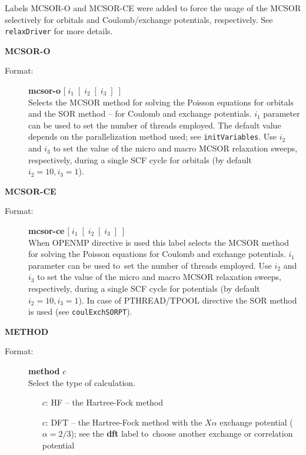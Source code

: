 \documentclass[10pt,a4paper]{article}
\newcommand{\ft}[1]{\texttt{#1}}
\newcommand{\fb}[1]{\textbf{#1}}
\begin{document}
\begin{description}
\begin{description}
  Labels MCSOR-O and MCSOR-CE were added to force the usage
  of the MCSOR selectively for orbitals and Coulomb/exchange potentials,
  respectively. See \ft{relaxDriver} for more details.
  
\end{description}

\item \textbf{MCSOR-O}
\begin{description}
\item[Format:] \textbf{mcsor-o} $[\;i_1\;[\;i_2\;[\;i_3\;]\;]$\\
  Selects the MCSOR method for solving the Poisson equations for orbitals
  and the SOR method -- for Coulomb and exchange potentials. $i_1$
  parameter can be used to set the number of threads employed. The default
  value depends on the parallelization method used; see
  \ft{initVariables}. Use $i_2$ and $i_3$ to set the value of the micro and
  macro MCSOR relaxation sweeps, respectively, during a single SCF cycle
  for orbitals (by default $i_2=10, i_3=1$).
\end{description}

\item \textbf{MCSOR-CE}
\begin{description}
\item[Format:] \textbf{mcsor-ce} $[\;i_1\;[\;i_2\;[\;i_3\;]\;]$\\
  When OPENMP directive is used this label selects the MCSOR method for
  solving the Poisson equations for Coulomb and exchange potentials.  $i_1$
  parameter can be used to~set the number of threads employed. Use $i_2$
  and $i_3$ to set the value of the micro and macro MCSOR relaxation
  sweeps, respectively, during a single SCF cycle for potentials (by
  default $i_2=10, i_3=1$). In case of PTHREAD/TPOOL directive the SOR
  method is used (see \ft{coulExchSORPT}).
\end{description}

\item \textbf{METHOD}
\begin{description}
\item[Format:] \textbf{method} $c$\\
Select the type of calculation.
\begin{itemize}
\item[$c$:] HF -- the Hartree-Fock method
\item[$c$:] DFT -- the Hartree-Fock method with the $X\alpha$ exchange
  potential ($\alpha=2/3$); see the \fb{dft} label to~choose another
  exchange or correlation potential


\end{itemize}
\end{description}
\end{description}
\end{document}
